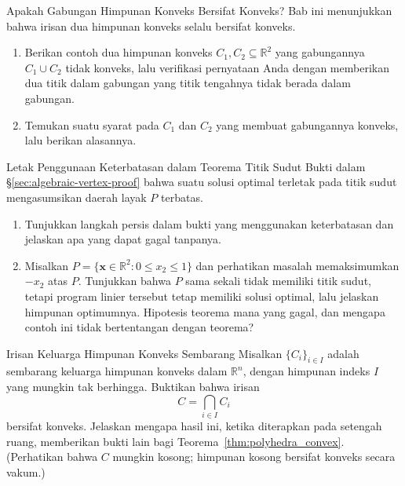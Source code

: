 \begin{ex}{Apakah Gabungan Himpunan Konveks Bersifat Konveks?}{}
\label{ex:union-convex}
Bab ini menunjukkan bahwa irisan dua himpunan konveks selalu bersifat konveks.
\begin{enumerate}
    \item Berikan contoh dua himpunan konveks \( C_1, C_2 \subseteq \mathbb{R}^2 \) yang gabungannya \( C_1 \cup C_2 \) tidak konveks, lalu verifikasi pernyataan Anda dengan memberikan dua titik dalam gabungan yang titik tengahnya tidak berada dalam gabungan.
    \item Temukan suatu syarat pada \( C_1 \) dan \( C_2 \) yang membuat gabungannya konveks, lalu berikan alasannya.
\end{enumerate}
\exrefs{\S\ref{sec:convexity}}
\end{ex}

\begin{ex}{Letak Penggunaan Keterbatasan dalam Teorema Titik Sudut}{}
\label{ex:boundedness-vertex}
Bukti dalam \S\ref{sec:algebraic-vertex-proof} bahwa suatu solusi optimal terletak pada titik sudut mengasumsikan daerah layak \( P \) terbatas.
\begin{enumerate}
    \item Tunjukkan langkah persis dalam bukti yang menggunakan keterbatasan dan jelaskan apa yang dapat gagal tanpanya.
    \item Misalkan \( P = \{ \mathbf{x} \in \mathbb{R}^2 : 0 \leq x_2 \leq 1 \} \) dan perhatikan masalah memaksimumkan \( -x_2 \) atas \( P \). Tunjukkan bahwa \( P \) sama sekali tidak memiliki titik sudut, tetapi program linier tersebut tetap memiliki solusi optimal, lalu jelaskan himpunan optimumnya. Hipotesis teorema mana yang gagal, dan mengapa contoh ini tidak bertentangan dengan teorema?
\end{enumerate}
\exrefs{\S\ref{sec:algebraic-vertex-proof}}
\end{ex}


\begin{ex}{Irisan Keluarga Himpunan Konveks Sembarang}{}
\label{ex:intersection-family}
Misalkan \( \{ C_i \}_{i \in I} \) adalah sembarang keluarga himpunan konveks dalam \( \mathbb{R}^n \), dengan himpunan indeks \( I \) yang mungkin tak berhingga. Buktikan bahwa irisan
\[
C = \bigcap_{i \in I} C_i
\]
bersifat konveks. Jelaskan mengapa hasil ini, ketika diterapkan pada setengah ruang, memberikan bukti lain bagi Teorema~\ref{thm:polyhedra_convex}. (Perhatikan bahwa \( C \) mungkin kosong; himpunan kosong bersifat konveks secara vakum.)
\end{ex}

